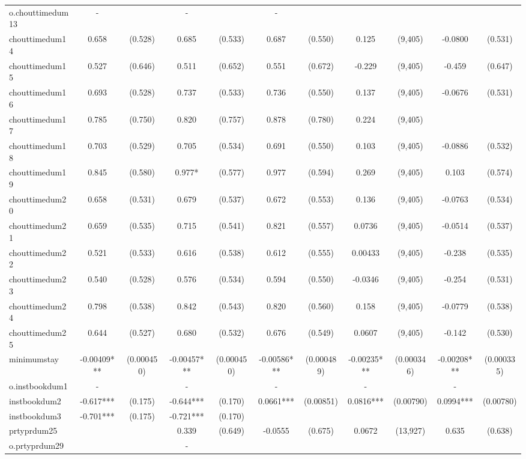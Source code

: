 \documentclass[]{article}
\begin{document}
\begin{tabular}{lcccccccccc}
o.chouttimedum13 & - &  & - &  & - &  &  &  &  &  \\
chouttimedum14 & 0.658 & (0.528) & 0.685 & (0.533) & 0.687 & (0.550) & 0.125 & (9,405) & -0.0800 & (0.531) \\
chouttimedum15 & 0.527 & (0.646) & 0.511 & (0.652) & 0.551 & (0.672) & -0.229 & (9,405) & -0.459 & (0.647) \\
chouttimedum16 & 0.693 & (0.528) & 0.737 & (0.533) & 0.736 & (0.550) & 0.137 & (9,405) & -0.0676 & (0.531) \\
chouttimedum17 & 0.785 & (0.750) & 0.820 & (0.757) & 0.878 & (0.780) & 0.224 & (9,405) &  &  \\
chouttimedum18 & 0.703 & (0.529) & 0.705 & (0.534) & 0.691 & (0.550) & 0.103 & (9,405) & -0.0886 & (0.532) \\
chouttimedum19 & 0.845 & (0.580) & 0.977* & (0.577) & 0.977 & (0.594) & 0.269 & (9,405) & 0.103 & (0.574) \\
chouttimedum20 & 0.658 & (0.531) & 0.679 & (0.537) & 0.672 & (0.553) & 0.136 & (9,405) & -0.0763 & (0.534) \\
chouttimedum21 & 0.659 & (0.535) & 0.715 & (0.541) & 0.821 & (0.557) & 0.0736 & (9,405) & -0.0514 & (0.537) \\
chouttimedum22 & 0.521 & (0.533) & 0.616 & (0.538) & 0.612 & (0.555) & 0.00433 & (9,405) & -0.238 & (0.535) \\
chouttimedum23 & 0.540 & (0.528) & 0.576 & (0.534) & 0.594 & (0.550) & -0.0346 & (9,405) & -0.254 & (0.531) \\
chouttimedum24 & 0.798 & (0.538) & 0.842 & (0.543) & 0.820 & (0.560) & 0.158 & (9,405) & -0.0779 & (0.538) \\
chouttimedum25 & 0.644 & (0.527) & 0.680 & (0.532) & 0.676 & (0.549) & 0.0607 & (9,405) & -0.142 & (0.530) \\
minimumstay & -0.00409*** & (0.000450) & -0.00457*** & (0.000450) & -0.00586*** & (0.000489) & -0.00235*** & (0.000346) & -0.00208*** & (0.000335) \\
o.instbookdum1 & - &  & - &  & - &  & - &  & - &  \\
instbookdum2 & -0.617*** & (0.175) & -0.644*** & (0.170) & 0.0661*** & (0.00851) & 0.0816*** & (0.00790) & 0.0994*** & (0.00780) \\
instbookdum3 & -0.701*** & (0.175) & -0.721*** & (0.170) &  &  &  &  &  &  \\
prtyprdum25 &  &  & 0.339 & (0.649) & -0.0555 & (0.675) & 0.0672 & (13,927) & 0.635 & (0.638) \\
o.prtyprdum29 &  &  & - &  &  &  &  &  &  &  \\

\end{tabular}
\end{document}
